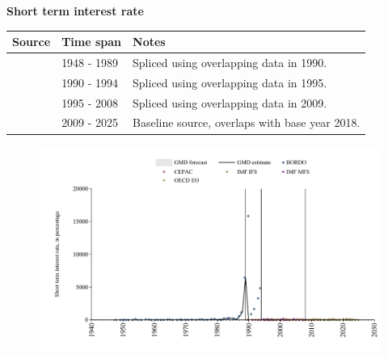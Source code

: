 \documentclass[12pt,a4paper,landscape]{article}
\begin{document}
\begin{adjustbox}{max totalsize={\paperwidth}{\paperheight},center}
\begin{minipage}[t][\textheight][t]{\textwidth}
\vspace*{0.5cm}
{}
\begin{center}
{\Large\bfseries Short term interest rate}
\end{center}
\vspace{0.5cm}
\begin{table}[H]
\centering
\small
\begin{tabular}{|l|l|l|}
\hline
\textbf{Source} & \textbf{Time span} & \textbf{Notes} \\
\hline
\rowcolor{white}\cite{BORDO}& 1948 - 1989 &Spliced using overlapping data in 1990. \\
\rowcolor{lightgray}\cite{CEPAC}& 1990 - 1994 &Spliced using overlapping data in 1995. \\
\rowcolor{white}\cite{IMF_MFS}& 1995 - 2008 &Spliced using overlapping data in 2009. \\
\rowcolor{lightgray}\cite{OECD_EO}& 2009 - 2025 &Baseline source, overlaps with base year 2018. \\
\hline
\end{tabular}
\end{table}
\begin{figure}[H]
\centering
\includegraphics[width=\textwidth,height=0.6\textheight,keepaspectratio]{graphs/BRA_strate.pdf}
\end{figure}
\end{minipage}
\end{adjustbox}
\end{document}
